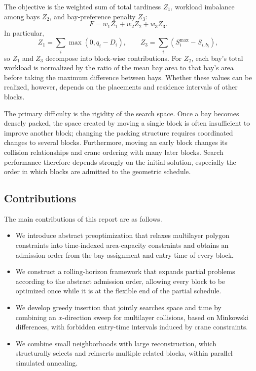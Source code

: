 \documentclass[runningheads]{llncs}
\begin{document}
The objective is the weighted sum of total tardiness $Z_1$, workload imbalance among bays $Z_2$, and bay-preference penalty $Z_3$:
\begin{equation}
F=w_1Z_1+w_2Z_2+w_3Z_3.
\end{equation}
In particular,
\begin{equation}
Z_1=\sum_i\max(0,q_i-D_i),\qquad
Z_3=\sum_i(S_i^{\max}-S_{i,b_i}),
\end{equation}
so $Z_1$ and $Z_3$ decompose into block-wise contributions. For $Z_2$, each bay's total workload is normalized by the ratio of the mean bay area to that bay's area before taking the maximum difference between bays. Whether these values can be realized, however, depends on the placements and residence intervals of other blocks.

The primary difficulty is the rigidity of the search space. Once a bay becomes densely packed, the space created by moving a single block is often insufficient to improve another block; changing the packing structure requires coordinated changes to several blocks. Furthermore, moving an early block changes its collision relationships and crane ordering with many later blocks. Search performance therefore depends strongly on the initial solution, especially the order in which blocks are admitted to the geometric schedule.

\subsection{Contributions}

The main contributions of this report are as follows.
\begin{itemize}
    \item We introduce abstract preoptimization that relaxes multilayer polygon constraints into time-indexed area-capacity constraints and obtains an admission order from the bay assignment and entry time of every block.
    \item We construct a rolling-horizon framework that expands partial problems according to the abstract admission order, allowing every block to be optimized once while it is at the flexible end of the partial schedule.
    \item We develop greedy insertion that jointly searches space and time by combining an $x$-direction sweep for multilayer collisions, based on Minkowski differences, with forbidden entry-time intervals induced by crane constraints.
    \item We combine small neighborhoods with large reconstruction, which structurally selects and reinserts multiple related blocks, within parallel simulated annealing.
\end{itemize}
\end{document}
